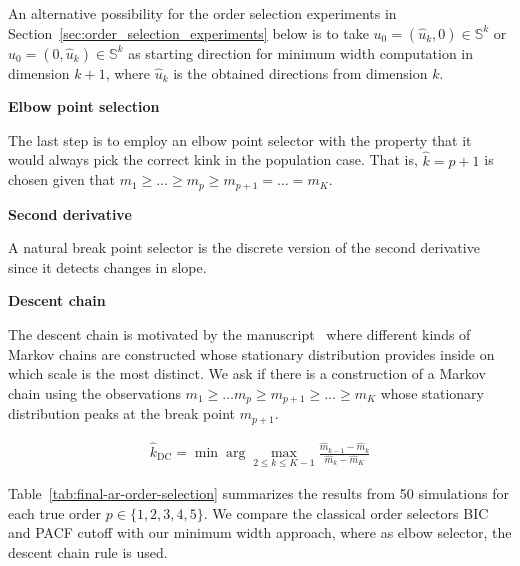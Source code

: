 An alternative possibility for the order selection experiments in Section~\ref{sec:order_selection_experiments} below is to take $u_0=(\hat{u}_k,0)\in\mathbb{S}^k$ or $u_0=(0,\hat{u}_k)\in\mathbb{S}^{k}$ as starting direction for minimum width computation in dimension $k+1$, where $\hat{u}_k$ is the obtained directions from dimension $k$.

\textbf{Elbow point selection}


The last step is to employ an elbow point selector with the property that it would always pick the correct kink in the population case. That is, $\hat{k}=p+1$ is chosen given that $m_1\ge\dots\ge m_p\ge m_{p+1}=\dots=m_K$.

\textbf{Second derivative}

A natural break point selector is the discrete version of the second derivative since it detects changes in slope. 

\textbf{Descent chain}

The descent chain is motivated by the manuscript~\cite{Baralic2026} where different kinds of Markov chains are constructed whose stationary distribution provides inside on which scale is the most distinct. We ask if there is a construction of a Markov chain using the observations $m_1\ge\dots m_p\ge m_{p+1}\ge\dots\ge m_K$ whose stationary distribution peaks at the break point $m_{p+1}$.

\begin{align*}
    \hat{k}_{\text{DC}}=\min\arg\max_{2\le k\le K-1}\frac{\hat{m}_{k-1}-\hat{m}_k}{\hat{m}_k-\hat{m}_K}
\end{align*}

Table~\ref{tab:final-ar-order-selection} summarizes the results from 50 simulations for each true order $p\in\{1,2,3,4,5\}$. We compare the classical order selectors BIC and PACF cutoff with our minimum width approach, where as elbow selector, the descent chain rule is used.

